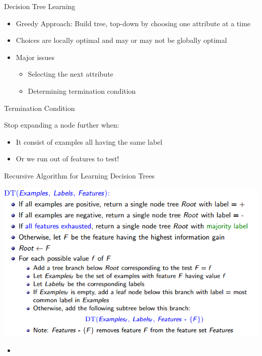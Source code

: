 \documentclass{beamer}
\begin{document}
\begin{frame}{Decision Tree Learning}
    \begin{itemize}
        \item Greedy Approach: Build tree, top-down by choosing one attribute at a time
        \item Choices are locally optimal and may or may not be globally optimal 
        \item Major issues
        \begin{itemize}
            \item Selecting the next attribute
            \item Determining termination condition
        \end{itemize}
    \end{itemize}
\end{frame}


\begin{frame}{Termination Condition}

    Stop expanding a node further when: \pause
    \begin{itemize}
        \item It consist of examples all having the same label 
        \item Or we run out of features to test!
    \end{itemize}
\end{frame}


\begin{frame}{Recursive Algorithm for Learning Decision Trees}
    \begin{center}
        \includegraphics[scale=0.4]{dTreeLearningAlgo.png}
    \end{center}
\end{frame}


\begin{frame}{}
    \begin{itemize}
        \item 
    \end{itemize}
\end{frame}
\end{document}
